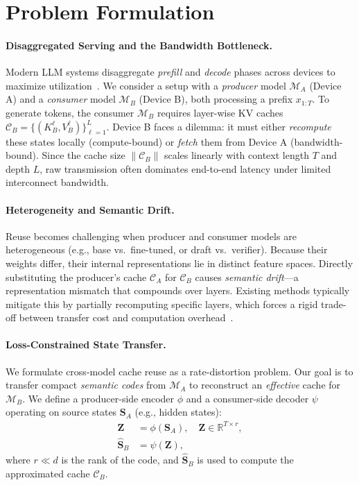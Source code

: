 \documentclass{article}
\theoremstyle{plain}
\theoremstyle{definition}
\theoremstyle{remark}
\begin{document}
\section{Problem Formulation}
\label{sec:problem}

\paragraph{Disaggregated Serving and the Bandwidth Bottleneck.}
Modern LLM systems disaggregate \emph{prefill} and \emph{decode} phases across devices to maximize utilization~\cite{zhong2024distserve,qin2024mooncake}.
We consider a setup with a \emph{producer} model $\mathcal{M}_A$ (Device A) and a \emph{consumer} model $\mathcal{M}_B$ (Device B), both processing a prefix $x_{1:T}$.
To generate tokens, the consumer $\mathcal{M}_B$ requires layer-wise KV caches $\mathcal{C}_B = \{(K_B^\ell, V_B^\ell)\}_{\ell=1}^L$.
Device B faces a dilemma: it must either \emph{recompute} these states locally (compute-bound) or \emph{fetch} them from Device A (bandwidth-bound).
Since the cache size $\|\mathcal{C}_B\|$ scales linearly with context length $T$ and depth $L$, raw transmission often dominates end-to-end latency under limited interconnect bandwidth.

\paragraph{Heterogeneity and Semantic Drift.}
Reuse becomes challenging when producer and consumer models are heterogeneous (e.g., base vs.\ fine-tuned, or draft vs.\ verifier).
Because their weights differ, their internal representations lie in distinct feature spaces.
Directly substituting the producer's cache $\mathcal{C}_A$ for $\mathcal{C}_B$ causes \emph{semantic drift}---a representation mismatch that compounds over layers.
Existing methods typically mitigate this by partially recomputing specific layers, which forces a rigid trade-off between transfer cost and computation overhead~\cite{liu2024droidspeak}.

\paragraph{Loss-Constrained State Transfer.}
We formulate cross-model cache reuse as a rate-distortion problem.
Our goal is to transfer compact \emph{semantic codes} from $\mathcal{M}_A$ to reconstruct an \emph{effective} cache for $\mathcal{M}_B$.
We define a producer-side encoder $\phi$ and a consumer-side decoder $\psi$ operating on source states $\mathbf{S}_A$ (e.g., hidden states):
\begin{align}
\mathbf{Z} &= \phi(\mathbf{S}_A), \quad \mathbf{Z} \in \mathbb{R}^{T \times r}, \\
\hat{\mathbf{S}}_B &= \psi(\mathbf{Z}),
\end{align}
where $r \ll d$ is the rank of the code, and $\hat{\mathbf{S}}_B$ is used to compute the approximated cache $\hat{\mathcal{C}}_B$.
\end{document}
